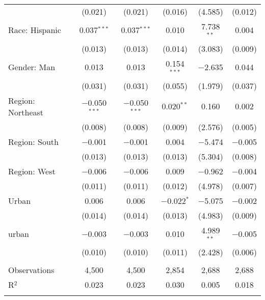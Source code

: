 \begin{tabular}{@{\extracolsep{5pt}}lccccc}
  & (0.021) & (0.021) & (0.016) & (4.585) & (0.012) \\ 
  Race: Hispanic & 0.037$^{***}$ & 0.037$^{***}$ & 0.010 & 7.738$^{**}$ & 0.004 \\ 
  & (0.013) & (0.013) & (0.014) & (3.083) & (0.009) \\ 
  Gender: Man & 0.013 & 0.013 & 0.154$^{***}$ & $-$2.635 & 0.044 \\ 
  & (0.031) & (0.031) & (0.055) & (1.979) & (0.037) \\ 
  Region: Northeast & $-$0.050$^{***}$ & $-$0.050$^{***}$ & 0.020$^{**}$ & 0.160 & 0.002 \\ 
  & (0.008) & (0.008) & (0.009) & (2.576) & (0.005) \\ 
  Region: South & $-$0.001 & $-$0.001 & 0.004 & $-$5.474 & $-$0.005 \\ 
  & (0.013) & (0.013) & (0.013) & (5.304) & (0.008) \\ 
  Region: West & $-$0.006 & $-$0.006 & 0.009 & $-$0.962 & $-$0.004 \\ 
  & (0.011) & (0.011) & (0.012) & (4.978) & (0.007) \\ 
  Urban & 0.006 & 0.006 & $-$0.022$^{*}$ & $-$5.075 & $-$0.002 \\ 
  & (0.014) & (0.014) & (0.013) & (4.983) & (0.009) \\ 
  urban & $-$0.003 & $-$0.003 & 0.010 & 4.989$^{**}$ & $-$0.005 \\ 
  & (0.010) & (0.010) & (0.011) & (2.428) & (0.006) \\ 
 \hline \\[-1.8ex] 

Observations & 4,500 & 4,500 & 2,854 & 2,688 & 2,688 \\ 
R$^{2}$ & 0.023 & 0.023 & 0.030 & 0.005 & 0.018 \\ 
\hline 
\hline \\[-1.8ex] 
\end{tabular} 